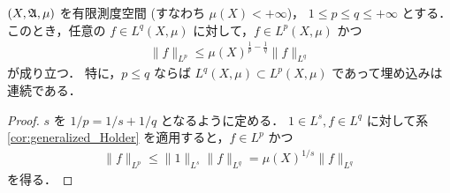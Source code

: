 \begin{corollary}\label{cor:Lp_inclusion}
    $(X,\mathfrak{A},\mu)$ を有限測度空間 (すなわち $\mu(X)<+\infty$)，
    $1\le p\le q\le+\infty$ とする．
    このとき，任意の $f\in L^q(X,\mu)$ に対して，$f\in L^p(X,\mu)$ かつ
    \begin{align*}
        \|f\|_{L^p}\le\mu(X)^{\frac{1}{p}-\frac{1}{q}}\|f\|_{L^q}
    \end{align*}
    が成り立つ．
    特に，$p\le q$ ならば $L^q(X,\mu)\subset L^p(X,\mu)$ であって埋め込みは連続である．
\end{corollary}

\begin{proof}
    $s$ を $1/p=1/s+1/q$ となるように定める．
    $1\in L^s,f\in L^q$ に対して系 \ref{cor:generalized_Holder} を適用すると，$f\in L^p$ かつ
    \begin{align*}
        \|f\|_{L^p}
        \le\|1\|_{L^s}\|f\|_{L^q}
        =\mu(X)^{1/s}\|f\|_{L^q}
    \end{align*}
    を得る．
\end{proof}


